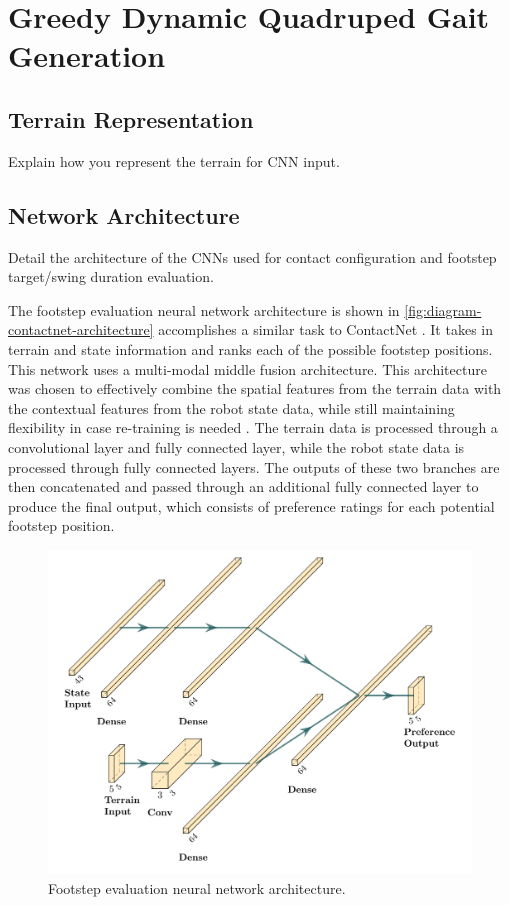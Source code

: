 \section{Greedy Dynamic Quadruped Gait Generation}

\subsection{Terrain Representation}

\begin{outline}
  Explain how you represent the terrain for CNN input.
\end{outline}

\subsection{Network Architecture}

\begin{outline}
  Detail the architecture of the CNNs used for contact configuration
  and footstep target/swing duration evaluation.
\end{outline}

The footstep evaluation neural network architecture is shown in
\autoref{fig:diagram-contactnet-architecture} accomplishes a similar
task to ContactNet \cite{bratta_contactnet_2024}. It takes in terrain
and state information and ranks each of the possible footstep
positions. This network uses a multi-modal middle fusion
architecture. This architecture was chosen to effectively combine the
spatial features from the terrain data with the contextual features
from the robot state data, while still maintaining flexibility in
case re-training is needed \cite{feng2021deep}. The terrain data is
processed through a convolutional layer and fully connected layer,
while the robot state data is processed through fully connected
layers. The outputs of these two branches are then concatenated and
passed through an additional fully connected layer to produce the
final output, which consists of preference ratings for each potential
footstep position.

\begin{figure}
  \centering
  \includegraphics[width=0.5\linewidth]{images/diagrams/nn-architecture.png}
  \caption{Footstep evaluation neural network architecture.}
  \label{fig:diagram-contactnet-architecture}
\end{figure}

